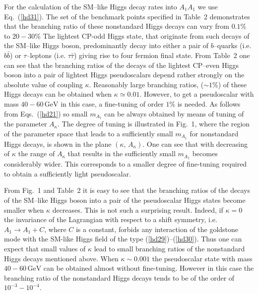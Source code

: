 \documentclass[12pt,a4paper]{article}
\begin{document}
For the calculation of the SM--like Higgs decay rates into $A_1 A_1$
we use Eq.~(\ref{hd31}). The set of the benchmark points specified in
Table~2 demonstrates that the branching ratio of these nonstandard
Higgs decays can vary from $0.1\%$ to $20-30\%$ The lightest CP-odd
Higgs state, that originate from such decays of the SM--like Higgs
boson, predominantly decay into either a pair of $b$--quarks
(i.e. $b\bar{b}$) or $\tau$--leptons (i.e. $\tau\bar{\tau}$) giving
rise to four fermion final state.  From Table~2 one can see that the
branching ratios of the decays of the lightest CP--even Higgs boson
into a pair of lightest Higgs pseudoscalars depend rather strongly on
the absolute value of coupling $\kappa$. Reasonably large branching
ratios, ($\sim 1\%$) of these Higgs decays can be obtained when
$\kappa\simeq 0.01$. However, to get a pseudoscalar with mass
$40-60\,\mbox{GeV}$ in this case, a fine-tuning of order $1\%$ is
needed. As follows from Eqs.~(\ref{hd21}) so small $m_{A_1}$ can be
always obtained by means of tuning of the parameter $A_{\kappa}$. The
degree of tuning is illustrated in Fig.~1, where the region of the
parameter space that leads to a sufficiently small $m_{A_1}$ for
nonstandard Higgs decays, is shown in the plane $(\kappa,\,
A_{\kappa})$.  One can see that with decreasing of $\kappa$ the range
of $A_{\kappa}$ that results in the sufficiently small $m_{A_1}$
becomes considerably wider.  This corresponds to a smaller degree of
fine-tuning required to obtain a sufficiently light pseudoscalar.

From Fig.~1 and Table~2 it is easy to see that the branching ratios of
the decays of the SM--like Higgs boson into a pair of the pseudoscalar
Higgs states become smaller when $\kappa$ decreases.  This is not such
a surprising result. Indeed, if $\kappa=0$ the invariance of the
Lagrangian with respect to a shift symmetry, i.e. $A_1\to A_1 + C$,
where $C$ is a constant, forbids any interaction of the goldstone mode
with the SM-like Higgs field of the type
(\ref{hd29})--(\ref{hd30}). Thus one can expect that small values of
$\kappa$ lead to small branching ratios of the nonstandard Higgs
decays mentioned above.  When $\kappa\sim 0.001$ the pseudoscalar
state with mass $40-60\,\mbox{GeV}$ can be obtained almost without
fine-tuning. However in this case the branching ratio of the
nonstandard Higgs decays tends to be of the order of
$10^{-3}-10^{-4}$.
\end{document}
